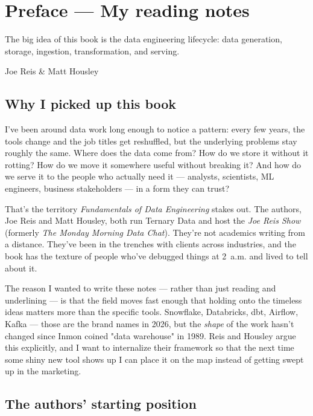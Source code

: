 \chapter*{Preface — My reading notes}

\epigraph{The big idea of this book is the data engineering lifecycle: data generation, storage, ingestion, transformation, and serving.}{Joe Reis \& Matt Housley}

\section*{Why I picked up this book}

I've been around data work long enough to notice a pattern: every few years, the tools change and the job titles get reshuffled, but the underlying problems stay roughly the same. Where does the data come from? How do we store it without it rotting? How do we move it somewhere useful without breaking it? And how do we serve it to the people who actually need it — analysts, scientists, ML engineers, business stakeholders — in a form they can trust?

That's the territory \emph{Fundamentals of Data Engineering} stakes out. The authors, Joe Reis and Matt Housley, both run Ternary Data and host the \emph{Joe Reis Show} (formerly \emph{The Monday Morning Data Chat}). They're not academics writing from a distance. They've been in the trenches with clients across industries, and the book has the texture of people who've debugged things at 2~a.m. and lived to tell about it.

The reason I wanted to write these notes — rather than just reading and underlining — is that the field moves fast enough that holding onto the timeless ideas matters more than the specific tools. Snowflake, Databricks, dbt, Airflow, Kafka — those are the brand names in 2026, but the \emph{shape} of the work hasn't changed since Inmon coined "data warehouse" in 1989. Reis and Housley argue this explicitly, and I want to internalize their framework so that the next time some shiny new tool shows up I can place it on the map instead of getting swept up in the marketing.

\section*{The authors' starting position}

